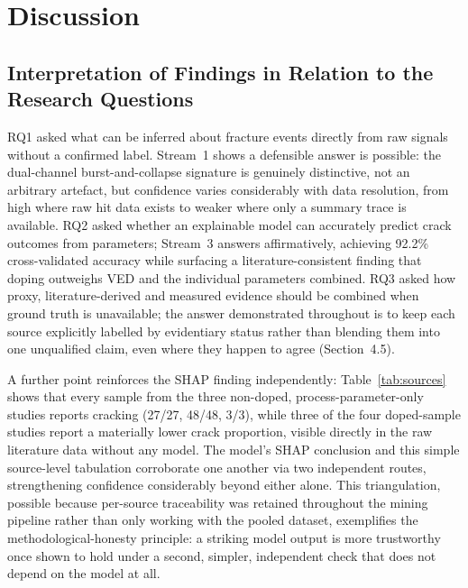 \documentclass[a4paper]{article}
\begin{document}
\section{Discussion}
\subsection{Interpretation of Findings in Relation to the Research Questions}
RQ1 asked what can be inferred about fracture events directly from raw signals without a confirmed label. Stream~1 shows a defensible answer is possible: the dual-channel burst-and-collapse signature is genuinely distinctive, not an arbitrary artefact, but confidence varies considerably with data resolution, from high where raw hit data exists to weaker where only a summary trace is available. RQ2 asked whether an explainable model can accurately predict crack outcomes from parameters; Stream~3 answers affirmatively, achieving 92.2\% cross-validated accuracy while surfacing a literature-consistent finding that doping outweighs VED and the individual parameters combined. RQ3 asked how proxy, literature-derived and measured evidence should be combined when ground truth is unavailable; the answer demonstrated throughout is to keep each source explicitly labelled by evidentiary status rather than blending them into one unqualified claim, even where they happen to agree (Section~4.5).

A further point reinforces the SHAP finding independently: Table~\ref{tab:sources} shows that every sample from the three non-doped, process-parameter-only studies reports cracking (27/27, 48/48, 3/3), while three of the four doped-sample studies report a materially lower crack proportion, visible directly in the raw literature data without any model. The model's SHAP conclusion and this simple source-level tabulation corroborate one another via two independent routes, strengthening confidence considerably beyond either alone. This triangulation, possible because per-source traceability was retained throughout the mining pipeline rather than only working with the pooled dataset, exemplifies the methodological-honesty principle: a striking model output is more trustworthy once shown to hold under a second, simpler, independent check that does not depend on the model at all.
\end{document}
